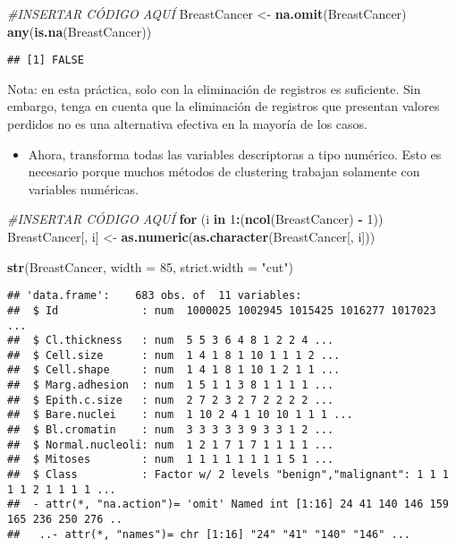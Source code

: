 \documentclass[
]{article}
\newenvironment{Shaded}{\begin{snugshade}}{\end{snugshade}}
\newcommand{\CommentTok}[1]{\textcolor[rgb]{0.56,0.35,0.01}{\textit{#1}}}
\newcommand{\ControlFlowTok}[1]{\textcolor[rgb]{0.13,0.29,0.53}{\textbf{#1}}}
\newcommand{\DataTypeTok}[1]{\textcolor[rgb]{0.13,0.29,0.53}{#1}}
\newcommand{\DecValTok}[1]{\textcolor[rgb]{0.00,0.00,0.81}{#1}}
\newcommand{\KeywordTok}[1]{\textcolor[rgb]{0.13,0.29,0.53}{\textbf{#1}}}
\newcommand{\NormalTok}[1]{#1}
\newcommand{\OperatorTok}[1]{\textcolor[rgb]{0.81,0.36,0.00}{\textbf{#1}}}
\newcommand{\StringTok}[1]{\textcolor[rgb]{0.31,0.60,0.02}{#1}}
\providecommand{\tightlist}{%
  \setlength{\itemsep}{0pt}\setlength{\parskip}{0pt}}
\begin{document}
\begin{Shaded}
\begin{Highlighting}[]
\CommentTok{#INSERTAR CÓDIGO AQUÍ}
\NormalTok{BreastCancer <-}\StringTok{ }\KeywordTok{na.omit}\NormalTok{(BreastCancer) }
\KeywordTok{any}\NormalTok{(}\KeywordTok{is.na}\NormalTok{(BreastCancer))}
\end{Highlighting}
\end{Shaded}

\begin{verbatim}
## [1] FALSE
\end{verbatim}

Nota: en esta práctica, solo con la eliminación de registros es
suficiente. Sin embargo, tenga en cuenta que la eliminación de registros
que presentan valores perdidos no es una alternativa efectiva en la
mayoría de los casos.

\begin{itemize}
\tightlist
\item
  Ahora, transforma todas las variables descriptoras a tipo numérico.
  Esto es necesario porque muchos métodos de clustering trabajan
  solamente con variables numéricas.
\end{itemize}

\begin{Shaded}
\begin{Highlighting}[]
\CommentTok{#INSERTAR CÓDIGO AQUÍ}
\ControlFlowTok{for}\NormalTok{ (i }\ControlFlowTok{in} \DecValTok{1}\OperatorTok{:}\NormalTok{(}\KeywordTok{ncol}\NormalTok{(BreastCancer) }\OperatorTok{-}\StringTok{ }\DecValTok{1}\NormalTok{))}
\NormalTok{  BreastCancer[, i] <-}\StringTok{ }\KeywordTok{as.numeric}\NormalTok{(}\KeywordTok{as.character}\NormalTok{(BreastCancer[, i]))}

\KeywordTok{str}\NormalTok{(BreastCancer, }\DataTypeTok{width =} \DecValTok{85}\NormalTok{, }\DataTypeTok{strict.width =} \StringTok{"cut"}\NormalTok{)}
\end{Highlighting}
\end{Shaded}

\begin{verbatim}
## 'data.frame':    683 obs. of  11 variables:
##  $ Id             : num  1000025 1002945 1015425 1016277 1017023 ...
##  $ Cl.thickness   : num  5 5 3 6 4 8 1 2 2 4 ...
##  $ Cell.size      : num  1 4 1 8 1 10 1 1 1 2 ...
##  $ Cell.shape     : num  1 4 1 8 1 10 1 2 1 1 ...
##  $ Marg.adhesion  : num  1 5 1 1 3 8 1 1 1 1 ...
##  $ Epith.c.size   : num  2 7 2 3 2 7 2 2 2 2 ...
##  $ Bare.nuclei    : num  1 10 2 4 1 10 10 1 1 1 ...
##  $ Bl.cromatin    : num  3 3 3 3 3 9 3 3 1 2 ...
##  $ Normal.nucleoli: num  1 2 1 7 1 7 1 1 1 1 ...
##  $ Mitoses        : num  1 1 1 1 1 1 1 1 5 1 ...
##  $ Class          : Factor w/ 2 levels "benign","malignant": 1 1 1 1 1 2 1 1 1 1 ...
##  - attr(*, "na.action")= 'omit' Named int [1:16] 24 41 140 146 159 165 236 250 276 ..
##   ..- attr(*, "names")= chr [1:16] "24" "41" "140" "146" ...
\end{verbatim}
\end{document}
